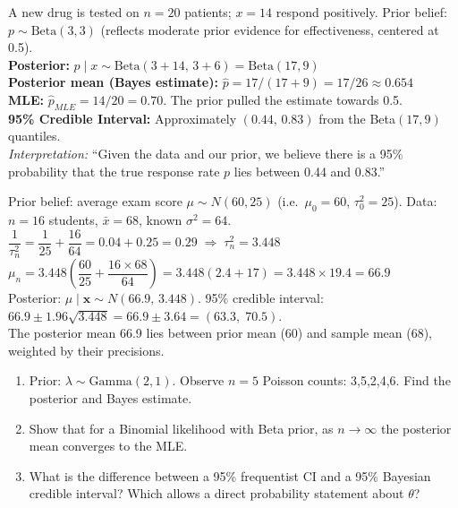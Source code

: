 \documentclass[12pt]{article}
\begin{document}
\begin{examplebox}
A new drug is tested on $n=20$ patients; $x=14$ respond positively. Prior belief: $p\sim\text{Beta}(3,3)$ (reflects moderate prior evidence for effectiveness, centered at 0.5).\\[6pt]
\textbf{Posterior:} $p\mid x\sim\text{Beta}(3+14,\,3+6)=\text{Beta}(17,9)$\\[4pt]
\textbf{Posterior mean (Bayes estimate):} $\hat p=17/(17+9)=17/26\approx\mathbf{0.654}$\\[4pt]
\textbf{MLE:} $\hat p_{MLE}=14/20=0.70$. The prior pulled the estimate towards 0.5.\\[4pt]
\textbf{95\% Credible Interval:} Approximately $(0.44,\,0.83)$ from the Beta$(17,9)$ quantiles.\\[6pt]
\textit{Interpretation:} ``Given the data and our prior, we believe there is a 95\% probability that the true response rate $p$ lies between 0.44 and 0.83.''
\end{examplebox}

\begin{examplebox}
Prior belief: average exam score $\mu\sim N(60,25)$ (i.e.\ $\mu_0=60$, $\tau_0^2=25$). Data: $n=16$ students, $\bar x=68$, known $\sigma^2=64$.\\[6pt]
$\dfrac{1}{\tau_n^2}=\dfrac{1}{25}+\dfrac{16}{64}=0.04+0.25=0.29\;\Rightarrow\;\tau_n^2=3.448$\\[6pt]
$\mu_n=3.448\!\left(\dfrac{60}{25}+\dfrac{16\times68}{64}\right)=3.448(2.4+17)=3.448\times19.4=\mathbf{66.9}$\\[6pt]
Posterior: $\mu\mid\mathbf x\sim N(66.9,\,3.448)$. 95\% credible interval: $66.9\pm1.96\sqrt{3.448}=66.9\pm3.64=(63.3,\;70.5)$.\\[4pt]
The posterior mean 66.9 lies between prior mean (60) and sample mean (68), weighted by their precisions.
\end{examplebox}

\begin{practicebox}
\begin{enumerate}[label=\textbf{Q\arabic*.},noitemsep]
  \item Prior: $\lambda\sim\text{Gamma}(2,1)$. Observe $n=5$ Poisson counts: 3,5,2,4,6. Find the posterior and Bayes estimate.
  \item Show that for a Binomial likelihood with Beta prior, as $n\to\infty$ the posterior mean converges to the MLE.
  \item What is the difference between a 95\% frequentist CI and a 95\% Bayesian credible interval? Which allows a direct probability statement about $\theta$?
\end{enumerate}
\end{practicebox}
\end{document}
